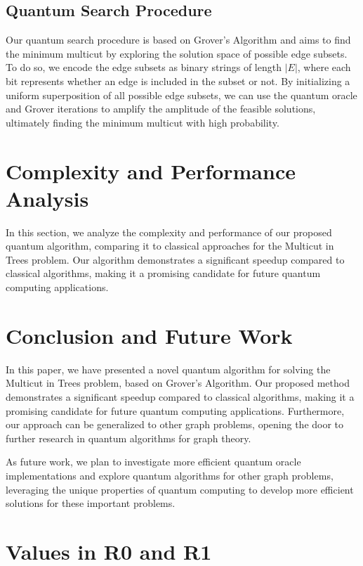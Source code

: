 \subsection{Quantum Search Procedure}

Our quantum search procedure is based on Grover's Algorithm and aims to find the minimum multicut by exploring the solution space of possible edge subsets. To do so, we encode the edge subsets as binary strings of length $|E|$, where each bit represents whether an edge is included in the subset or not. By initializing a uniform superposition of all possible edge subsets, we can use the quantum oracle and Grover iterations to amplify the amplitude of the feasible solutions, ultimately finding the minimum multicut with high probability.

\section{Complexity and Performance Analysis}
\label{sec:analysis}

In this section, we analyze the complexity and performance of our proposed quantum algorithm, comparing it to classical approaches for the Multicut in Trees problem. Our algorithm demonstrates a significant speedup compared to classical algorithms, making it a promising candidate for future quantum computing applications.

\section{Conclusion and Future Work}
\label{sec:conclusion}

In this paper, we have presented a novel quantum algorithm for solving the Multicut in Trees problem, based on Grover's Algorithm. Our proposed method demonstrates a significant speedup compared to classical algorithms, making it a promising candidate for future quantum computing applications. Furthermore, our approach can be generalized to other graph problems, opening the door to further research in quantum algorithms for graph theory.

As future work, we plan to investigate more efficient quantum oracle implementations and explore quantum algorithms for other graph problems, leveraging the unique properties of quantum computing to develop more efficient solutions for these important problems.



\section{Values in R0 and R1}

